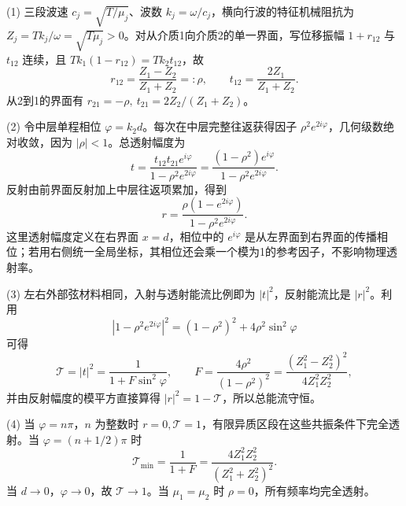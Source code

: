 (1) 三段波速 \(c_j=\sqrt{T/\mu_j}\)、波数 \(k_j=\omega/c_j\)，横向行波的特征机械阻抗为 \(Z_j=Tk_j/\omega=\sqrt{T\mu_j}>0\)。对从介质1向介质2的单一界面，写位移振幅 \(1+r_{12}\) 与 \(t_{12}\) 连续，且 \(Tk_1(1-r_{12})=Tk_2t_{12}\)，故
\[
r_{12}=\frac{Z_1-Z_2}{Z_1+Z_2}=:\rho,\qquad
t_{12}=\frac{2Z_1}{Z_1+Z_2}.
\]
从2到1的界面有 \(r_{21}=-\rho,\ t_{21}=2Z_2/(Z_1+Z_2)\)。

(2) 令中层单程相位 \(\varphi=k_2d\)。每次在中层完整往返获得因子 \(\rho^2e^{2i\varphi}\)，几何级数绝对收敛，因为 \(|\rho|<1\)。总透射幅度为
\[
t=\frac{t_{12}t_{21}e^{i\varphi}}{1-\rho^2e^{2i\varphi}}
=\frac{(1-\rho^2)e^{i\varphi}}{1-\rho^2e^{2i\varphi}}.
\]
反射由前界面反射加上中层往返项累加，得到
\[
r=\frac{\rho(1-e^{2i\varphi})}{1-\rho^2e^{2i\varphi}}.
\]
这里透射幅度定义在右界面 \(x=d\)，相位中的 \(e^{i\varphi}\) 是从左界面到右界面的传播相位；若用右侧统一全局坐标，其相位还会乘一个模为1的参考因子，不影响物理透射率。

(3) 左右外部弦材料相同，入射与透射能流比例即为 \(|t|^2\)，反射能流比是 \(|r|^2\)。利用
\[
|1-\rho^2e^{2i\varphi}|^2=(1-\rho^2)^2+4\rho^2\sin^2\varphi
\]
可得
\[
\mathcal T=|t|^2=\frac1{1+F\sin^2\varphi},\qquad
F=\frac{4\rho^2}{(1-\rho^2)^2}
=\frac{(Z_1^2-Z_2^2)^2}{4Z_1^2Z_2^2},
\]
并由反射幅度的模平方直接算得 \(|r|^2=1-\mathcal T\)，所以总能流守恒。

(4) 当 \(\varphi=n\pi\)，\(n\) 为整数时 \(r=0,\mathcal T=1\)，有限异质区段在这些共振条件下完全透射。当 \(\varphi=(n+1/2)\pi\) 时
\[
\mathcal T_{\min}=\frac1{1+F}=\frac{4Z_1^2Z_2^2}{(Z_1^2+Z_2^2)^2}.
\]
当 \(d\to0\)，\(\varphi\to0\)，故 \(\mathcal T\to1\)。当 \(\mu_1=\mu_2\) 时 \(\rho=0\)，所有频率均完全透射。
